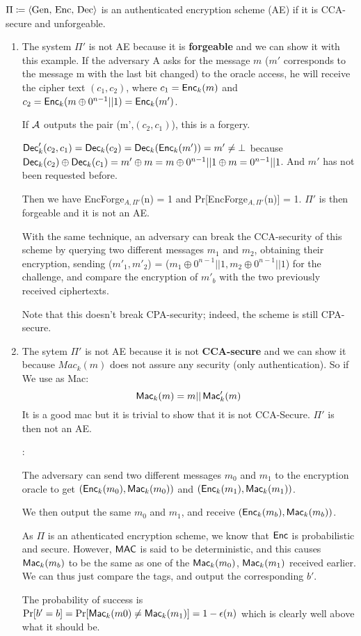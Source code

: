 \begin{solution}
	$\Pi \coloneqq \langle \text{Gen, Enc, Dec} \rangle$ is an authenticated encryption scheme (AE) if it is CCA-secure and unforgeable.
	\begin{enumerate}
		\item The system $\Pi'$ is not AE because it is \textbf{forgeable} and we can show it with this example. If the adversary A asks for the message $m$ ($m'$ corresponds to the message m with the last bit changed) to the oracle access, he will receive the cipher text $(c_1, c_2)$, where $c_1 = \operatorname{\mathsf{Enc}}_k(m)$ and $c_2 = \operatorname{\mathsf{Enc}}_k(m\oplus 0^{n-1}||1) = \operatorname{\mathsf{Enc}}_k(m')$.

		If $\mathcal{A}$ outputs the pair (m',$(c_2, c_1)$), this is a forgery.

		$\operatorname{\mathsf{Dec}}_k'(c_2,c_1) = \operatorname{\mathsf{Dec}}_k(c_2) = \operatorname{\mathsf{Dec}}_k(\operatorname{\mathsf{Enc}}_k(m')) = m' \neq \bot $ because $\operatorname{\mathsf{Dec}}_k(c_2) \oplus \operatorname{\mathsf{Dec}}_k(c_1) = m' \oplus m = m \oplus 0^{n-1}||1 \oplus m = 0^{n-1}||1 $.
		And $m'$ has not been requested before.

		Then we have EncForge$_{A, \Pi'}$(n) = 1  and Pr[EncForge$_{A, \Pi'}$(n)] = 1. $\Pi'$ is then forgeable and it is not an AE.

		With the same technique, an adversary can break the CCA-security of this scheme by querying two different messages $m_1$ and $m_2$, obtaining their encryption, sending \newline
		($m'_1,m'_2$) = ($m_1 \oplus 0^{n-1}||1, m_2 \oplus 0^{n-1}||1$) for the challenge, and compare the encryption of $m'_b$ with the two previously received ciphertexts.

		Note that this doesn't break CPA-security; indeed, the scheme is still CPA-secure.

		\item The sytem $\Pi'$ is not AE because it is not \textbf{CCA-secure} and we can show it because $Mac_k(m)$ does not assure any security (only authentication). So if We use as Mac:
		\[ \operatorname{\mathsf{Mac}}_k(m) = m||\operatorname{\mathsf{Mac}}'_k(m) \]
		It is a good mac but it is trivial to show that it is not CCA-Secure. $\Pi'$ is then not an AE.

		:

		The adversary can send two different messages $m_0$ and $m_1$ to the encryption oracle to get $(\operatorname{\mathsf{Enc}}_k(m_0), \operatorname{\mathsf{Mac}}_k(m_0))$ and $(\operatorname{\mathsf{Enc}}_k(m_1), \operatorname{\mathsf{Mac}}_k(m_1))$.

		We then output the same $m_0$ and $m_1$, and receive $(\operatorname{\mathsf{Enc}}_k(m_b), \operatorname{\mathsf{Mac}}_k(m_b))$.

		As $\Pi$ is an athenticated encryption scheme, we know that $\operatorname{\mathsf{Enc}}$ is probabilistic and secure.
		However, $\mathsf{MAC}$ is said to be deterministic, and this causes $\operatorname{\mathsf{Mac}}_k(m_b)$ to be the same as one of the $\operatorname{\mathsf{Mac}}_k(m_0)$, $\operatorname{\mathsf{Mac}}_k(m_1)$ received earlier.
		We can thus just compare the tags, and output the corresponding $b'$.

		The probability of success is $\Pr[b'=b] = \Pr[\operatorname{\mathsf{Mac}}_k(m0) \neq \operatorname{\mathsf{Mac}}_k(m_1)]=1-\epsilon(n)$ which is clearly well above what it should be.
	\end{enumerate}
\end{solution}



